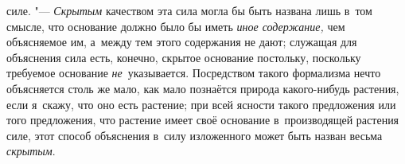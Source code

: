 силе. "--- {\em Скрытым} качеством эта сила могла бы быть названа лишь в~том
смысле, что основание должно было бы иметь {\em иное содержание,} чем
объясняемое им, а~между тем этого содержания не дают; служащая для объяснения
сила есть, конечно, скрытое основание постольку, поскольку требуемое основание
{\em не}~указывается. Посредством такого формализма нечто объясняется столь же
мало, как мало познаётся природа какого-нибудь растения, если я~скажу, что оно
есть растение; при всей ясности такого предложения или того предложения, что
растение имеет своё основание в~производящей растения силе, этот способ
объяснения в~силу изложенного может быть назван весьма {\em скрытым}.

